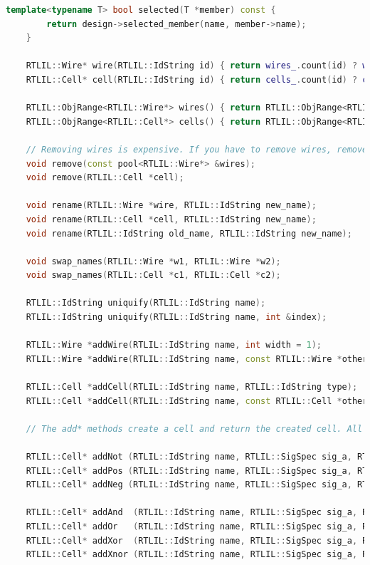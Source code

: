 \documentclass[11pt]{report}
\begin{document}
\begin{lstlisting}[language=C++]
	template<typename T> bool selected(T *member) const {
		return design->selected_member(name, member->name);
	}

	RTLIL::Wire* wire(RTLIL::IdString id) { return wires_.count(id) ? wires_.at(id) : nullptr; }
	RTLIL::Cell* cell(RTLIL::IdString id) { return cells_.count(id) ? cells_.at(id) : nullptr; }

	RTLIL::ObjRange<RTLIL::Wire*> wires() { return RTLIL::ObjRange<RTLIL::Wire*>(&wires_, &refcount_wires_); }
	RTLIL::ObjRange<RTLIL::Cell*> cells() { return RTLIL::ObjRange<RTLIL::Cell*>(&cells_, &refcount_cells_); }

	// Removing wires is expensive. If you have to remove wires, remove them all at once.
	void remove(const pool<RTLIL::Wire*> &wires);
	void remove(RTLIL::Cell *cell);

	void rename(RTLIL::Wire *wire, RTLIL::IdString new_name);
	void rename(RTLIL::Cell *cell, RTLIL::IdString new_name);
	void rename(RTLIL::IdString old_name, RTLIL::IdString new_name);

	void swap_names(RTLIL::Wire *w1, RTLIL::Wire *w2);
	void swap_names(RTLIL::Cell *c1, RTLIL::Cell *c2);

	RTLIL::IdString uniquify(RTLIL::IdString name);
	RTLIL::IdString uniquify(RTLIL::IdString name, int &index);

	RTLIL::Wire *addWire(RTLIL::IdString name, int width = 1);
	RTLIL::Wire *addWire(RTLIL::IdString name, const RTLIL::Wire *other);

	RTLIL::Cell *addCell(RTLIL::IdString name, RTLIL::IdString type);
	RTLIL::Cell *addCell(RTLIL::IdString name, const RTLIL::Cell *other);

	// The add* methods create a cell and return the created cell. All signals must exist in advance.

	RTLIL::Cell* addNot (RTLIL::IdString name, RTLIL::SigSpec sig_a, RTLIL::SigSpec sig_y, bool is_signed = false, const std::string &src = "");
	RTLIL::Cell* addPos (RTLIL::IdString name, RTLIL::SigSpec sig_a, RTLIL::SigSpec sig_y, bool is_signed = false, const std::string &src = "");
	RTLIL::Cell* addNeg (RTLIL::IdString name, RTLIL::SigSpec sig_a, RTLIL::SigSpec sig_y, bool is_signed = false, const std::string &src = "");

	RTLIL::Cell* addAnd  (RTLIL::IdString name, RTLIL::SigSpec sig_a, RTLIL::SigSpec sig_b, RTLIL::SigSpec sig_y, bool is_signed = false, const std::string &src = "");
	RTLIL::Cell* addOr   (RTLIL::IdString name, RTLIL::SigSpec sig_a, RTLIL::SigSpec sig_b, RTLIL::SigSpec sig_y, bool is_signed = false, const std::string &src = "");
	RTLIL::Cell* addXor  (RTLIL::IdString name, RTLIL::SigSpec sig_a, RTLIL::SigSpec sig_b, RTLIL::SigSpec sig_y, bool is_signed = false, const std::string &src = "");
	RTLIL::Cell* addXnor (RTLIL::IdString name, RTLIL::SigSpec sig_a, RTLIL::SigSpec sig_b, RTLIL::SigSpec sig_y, bool is_signed = false, const std::string &src = "");


\end{lstlisting}
\end{document}

